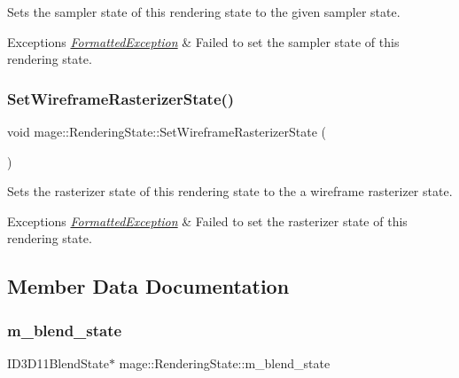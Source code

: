 Sets the sampler state of this rendering state to the given sampler state.


\begin{DoxyExceptions}{Exceptions}
{\em \hyperlink{structmage_1_1_formatted_exception}{Formatted\+Exception}} & Failed to set the sampler state of this rendering state. \\
\hline
\end{DoxyExceptions}
\hypertarget{structmage_1_1_rendering_state_a392b339b24950c71bfc7285bcca5eacf}{}\label{structmage_1_1_rendering_state_a392b339b24950c71bfc7285bcca5eacf} 
\subsubsection{\texorpdfstring{Set\+Wireframe\+Rasterizer\+State()}{SetWireframeRasterizerState()}}
{\footnotesize\ttfamily void mage\+::\+Rendering\+State\+::\+Set\+Wireframe\+Rasterizer\+State (\begin{DoxyParamCaption}{ }\end{DoxyParamCaption})}

Sets the rasterizer state of this rendering state to the a wireframe rasterizer state.


\begin{DoxyExceptions}{Exceptions}
{\em \hyperlink{structmage_1_1_formatted_exception}{Formatted\+Exception}} & Failed to set the rasterizer state of this rendering state. \\
\hline
\end{DoxyExceptions}


\subsection{Member Data Documentation}
\hypertarget{structmage_1_1_rendering_state_ab08e5f63a1bd463ce6029eaaf3526ae4}{}\label{structmage_1_1_rendering_state_ab08e5f63a1bd463ce6029eaaf3526ae4} 
\subsubsection{\texorpdfstring{m\+\_\+blend\+\_\+state}{m\_blend\_state}}
{\footnotesize\ttfamily I\+D3\+D11\+Blend\+State$\ast$ mage\+::\+Rendering\+State\+::m\+\_\+blend\+\_\+state\hspace{0.3cm}{\ttfamily [private]}}

